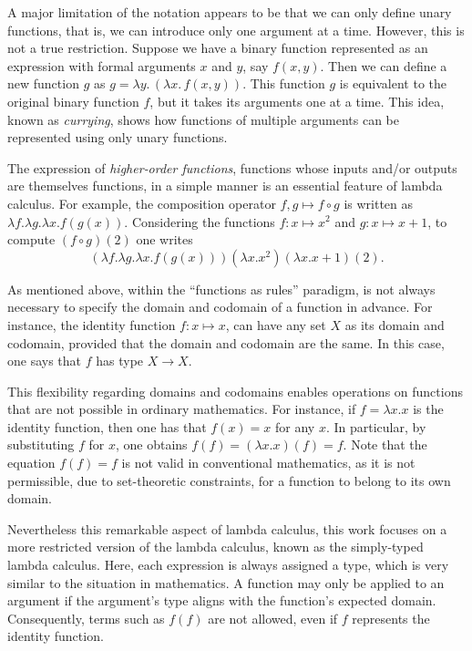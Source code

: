 A major limitation of the notation appears to be that we can only define unary functions, that is, we can introduce only one  argument at a time. However, this is not a true restriction.  Suppose we have a binary function represented as an expression with formal arguments $ x $ and $ y $, say $f(x, y)$. Then we can define a new function $ g $ as $g = \lambda y.\, (\lambda x.\, f(x, y))$.
This function $ g $ is equivalent to the original binary function $ f $, but it takes its arguments one at a time. This idea, known as \emph{currying}, shows how functions of multiple arguments can be represented using only unary functions.

The expression of \emph{higher‑order functions}, functions whose inputs and/or outputs are themselves functions, in a simple manner is an essential feature of lambda calculus. For example, the composition operator $f,g \mapsto f \circ g$ is written as $\lambda f. \lambda g. \lambda x. f(g(x))$. Considering the functions $f:x \mapsto x^2$ and $g:x \mapsto x+1$, to compute $(f \circ g)(2)$ one writes $$(\lambda f. \lambda g. \lambda x. f(g(x)))(\lambda x.x^2)(\lambda x.x+1)(2).$$

As mentioned above,  within  the “functions as rules” paradigm, is not
always necessary to specify the domain and codomain of a function in advance. For instance, the identity function $f: x \mapsto x$, can have any set $X$ as its domain and codomain, provided that the domain and codomain are the same. In this case, one says that $f$ has type $X \rightarrow{} X$.%

This flexibility regarding domains and codomains enables operations on functions that are not possible in ordinary mathematics. For instance, if $f = \lambda x.x$ is the identity function, then one has that $f(x) = x$ for any $x$. In particular, by substituting $f$ for $x$, one obtains $f(f) = (\lambda x.x)(f) = f$. Note that the equation $f(f) = f$ is not valid in conventional mathematics, as it is not permissible, due to set-theoretic constraints, for a function to belong to its own domain.

Nevertheless this remarkable aspect of lambda calculus, this work focuses on a more restricted version of the lambda calculus, known as the simply-typed lambda calculus. Here, each expression is always assigned a type, which is very similar to the situation in mathematics. A function may only be applied to an argument if the argument's type aligns with the function's expected domain. Consequently, terms such as $f(f)$ are not allowed, even if $f$ represents the identity function.


